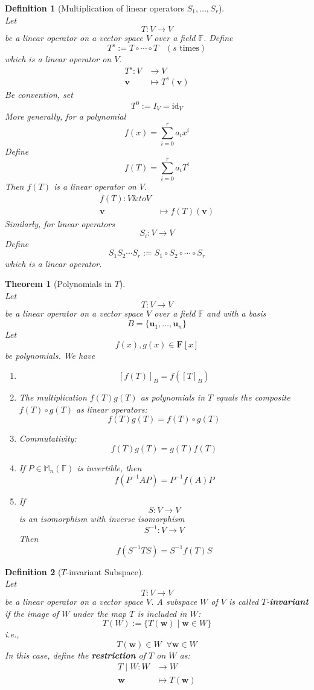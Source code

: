\documentclass[12pt]{article}
\newcommand{\id}{\mathrm{id}}
\newtheorem{definition}{Definition}[section]
\newtheorem{theorem}{Theorem}[section]
\theoremstyle{definition}
\begin{document}
\begin{definition}[Multiplication of linear operators $S_1,\ldots,S_r$]
\hfill\\\normalfont Let
\[
T:V\to V
\]
be a linear operator on a vector space $V$ over a field $\mathbb{F}$. Define
\[
T^s:=T\circ\cdots\circ T\;\;\;(s \text{ times})
\]
which is a linear operator on $V$.
\[
\begin{aligned}
T^s:V&\to V\\
\mathbf{v}&\mapsto T^s(\mathbf{v})
\end{aligned}
\]
Be convention, set
\[
T^0:=I_V=\id_V
\]
More generally, for a polynomial
\[
f(x)=\sum_{i=0}^r a_ix^i
\]
Define
\[
f(T)=\sum_{i=0}^r a_iT^i
\]
Then $f(T)$ is a linear operator on $V$.
\[
\begin{aligned}
f(T):V\&to V\\
\mathbf{v}&\mapsto f(T)(\mathbf{v})
\end{aligned}
\]
Similarly, for linear operators
\[
S_i:V\to V
\]
Define
\[
S_1S_2\cdots S_r:=S_1\circ S_2\circ\cdots \circ S_r
\]
which is a linear operator.
\end{definition}
\begin{theorem}[Polynomials in $T$]
\hfill\\\normalfont Let
\[
T:V\to V
\]
be a linear operator on a vector space $V$ over a field $\mathbb{F}$ and with a basis
\[
B=\{\mathbf{u}_1,\ldots,\mathbf{u}_n\}
\]
Let
\[
f(x),g(x)\in \mathbf{F}[x]
\]
be polynomials. We have
\begin{enumerate}[label=(\arabic*)]
\item 
\[
[f(T)]_B = f([T]_B)
\]
\item The multiplication $f(T)g(T)$ as polynomials in $T$ equals the composite $f(T)\circ g(T)$ as linear operators:
\[
f(T)g(T)=f(T)\circ g(T)
\]
\item Commutativity:
\[
f(T)g(T)=g(T)f(T)
\]
\item If $P\in\mathbb{M}_n(\mathbb{F})$ is invertible, then
\[
f(P^{-1}AP)=P^{-1}f(A)P
\]
\item If
\[
S:V\to V
\]
is an isomorphism with inverse isomorphism
\[
S^{-1}:V\to V
\]
Then
\[
f(S^{-1}TS)=S^{-1}f(T)S
\]
\end{enumerate}
\end{theorem}
\begin{definition}[$T$-invariant Subspace]
\hfill\\\normalfont Let
\[
T:V\to V
\]
be a linear operator on a vector space $V$. A subspace $W$ of $V$ is called $T$-\textbf{invariant} if the image of $W$ under the map $T$ is included in $W$:
\[
T(W):=\{T(\mathbf{w})\mid \mathbf{w}\in W\}
\]
i.e.,
\[
T(\mathbf{w})\in W \;\;\forall \mathbf{w}\in W
\]
In this case, define the \textbf{restriction} of $T$ on $W$ as:
\[
\begin{aligned}
T\mid W:W&\to W\\
\mathbf{w}&\mapsto T(\mathbf{w})
\end{aligned}
\] 
\end{definition}
\end{document}
